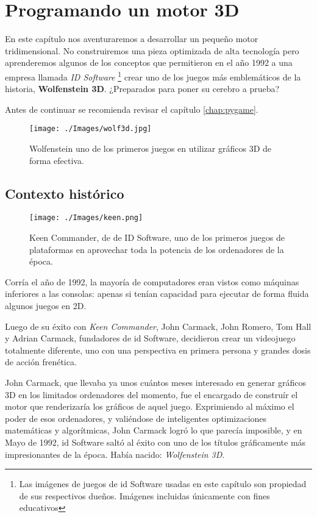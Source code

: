 \chapter{Programando un motor 3D}
\label{chap:motor-3d}

En este capítulo nos aventuraremos a desarrollar un pequeño motor tridimensional. No construiremos una pieza optimizada de alta tecnología pero aprenderemos algunos de los conceptos que permitieron en el año 1992 a una empresa llamada \emph{ID Software} \footnote{Las imágenes de juegos de id Software usadas en este capítulo son propiedad de sus respectivos dueños. Imágenes incluidas únicamente con fines educativos} crear uno de los juegos más emblemáticos de la historia, \textbf{Wolfenstein 3D}. ¿Preparados para poner su cerebro a prueba?

Antes de continuar se recomienda revisar el capítulo \autoref{chap:pygame}.

\begin{figure}[h!]
	\centering
	\texttt{[image: ./Images/wolf3d.jpg]}
	\caption{Wolfenstein uno de los primeros juegos en utilizar gráficos 3D de forma efectiva.}
	\label{wolf3d}
\end{figure}

\newpage

\section{Contexto histórico}

\begin{wrapfigure}{r}{0.4\textwidth}	
	\begin{center}
		\texttt{[image: ./Images/keen.png]}
	\end{center}
	\caption{Keen Commander, de de ID Software, uno de los primeros juegos de plataformas en aprovechar toda la potencia de los ordenadores de la época.}
	\label{keen}	
\end{wrapfigure}

Corría el año de 1992, la mayoría de computadores eran vistos como máquinas inferiores a las consolas: apenas si tenían capacidad para ejecutar de forma fluida algunos juegos en 2D.

Luego de su éxito con \emph{Keen Commander}, John Carmack, John Romero, Tom Hall y Adrian Carmack, fundadores de id Software, decidieron crear un videojuego totalmente diferente, uno con una perspectiva en primera persona y grandes dosis de acción frenética.

John Carmack, que llevaba ya unos cuántos meses interesado en generar gráficos 3D en los limitados ordenadores del momento, fue el encargado de construír el motor que renderizaría los gráficos de aquel juego. Exprimiendo al máximo el poder de esos ordenadores, y valiéndose de inteligentes optimizaciones matemáticas y algorítmicas, John Carmack logró lo que parecía imposible, y en Mayo de 1992, id Software saltó al éxito con uno de los títulos gráficamente más impresionantes de la época. Había nacido: \emph{Wolfenstein 3D}.
 
